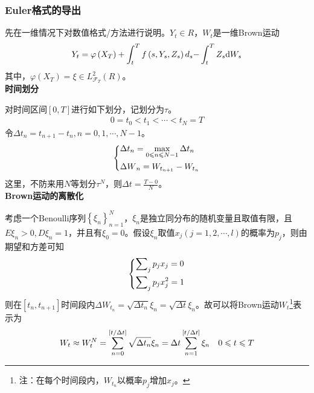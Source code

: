 		\subsubsection{Euler格式的导出}
			\par
			先在一维情况下对数值格式/方法进行说明。${Y_t} \in R$，$W_t$是一维Brown运动
					\begin{align}
					\centering
					{Y_t} = \varphi \left( {{X_T}} \right) + \int_t^T {f\left( {s,{Y_s},{Z_s}} \right){d_s} - } \int_t^T {{Z_s}\mathrm{d}{W_s}}
			 		\end{align}
			 其中，$\varphi ({X_T}) = \xi  \in L_{{\mathcal{F}}_T}^2(R)$。\\
			\textbf{时间划分}
			\par
			对时间区间$[0,T]$进行如下划分，记划分为$\tau$。
			\begin{align*}
			0 = {t_0} < {t_1} <  \cdots  < {t_N} = T
			\end{align*}
			令$\Delta {t_n} = {t_{n + 1}} - {t_n},n = 0,1, \cdots ,N - 1$。\\
				\begin{equation*}
					\centering
					\left\{
						\begin{lgathered}
						\Delta {t_n} = \max_{0 \leqslant n \leqslant N - 1} \Delta {t_n}\\
						\Delta W{_n} = W_{t_{n + 1}} - W_{t_n}
						\end{lgathered}
					\right.
				\end{equation*}
			 这里，不防来用$N$等划分$\tau^{N}$，则$\Delta t = \frac{{T - 0}}{N}$。\\
			 \textbf{Brown运动的离散化}
			 \par
			 考虑一个Benoulli序列$\left\{ {{\xi _n}} \right\}_{n = 1}^N$，${\xi _n}$是独立同分布的随机变量且取值有限，且$E{\xi _n} > 0,D{\xi _n} = 1$，并且有$\xi_0=0$。假设$\xi_n$取值$x_j(j=1,2,\cdots,l)$的概率为$p_j$，则由期望和方差可知
				\begin{equation*}
					\centering
					\left\{\begin{lgathered}
					{\sum\nolimits_j {{p_j}{x_j} = 0} }\\
					{\sum\nolimits_j {{p_j}x_j^2 = 1} }
					\end{lgathered} \right.
				\end{equation*}
			则在$[t_n,t_{n+1}]$时间段内$\Delta W_{t_n} = \sqrt {\Delta {t_n}} {\xi _n} = \sqrt {\Delta t} {\xi _n}$。故可以将Brown运动$W_t$\footnote{注：在每个时间段内，$W_{t_n}$以概率$p_j$增加$x_j$。}表示为
			 		\begin{equation*}
					\centering
					{W_t} \approx W_t^N = \sum\limits_{n = 0}^{\left[ {t/\Delta t} \right]} {\sqrt {\Delta {t_n}} {\xi _n}}  = \Delta t \sum\limits_{n = 1}^{\left[ {t/\Delta t} \right]} {{\xi _n}} \quad 0 \leqslant t \leqslant T
					\end{equation*}

